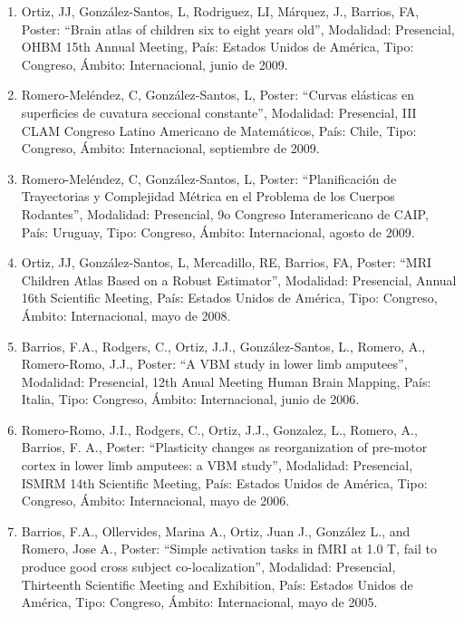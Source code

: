 \begin{enumerate}
\item Ortiz, JJ, González-Santos, L, Rodriguez, LI, Márquez, J., Barrios, FA, Poster: “Brain atlas of children 
six 
to eight years old”, Modalidad: Presencial, OHBM 15th Annual Meeting, País: Estados Unidos de América, Tipo: 
Congreso, Ámbito: Internacional, junio de 2009.

\item Romero-Meléndez, C, González-Santos, L, Poster: “Curvas elásticas en superficies de cuvatura seccional 
constante”, Modalidad: Presencial, III CLAM Congreso Latino Americano de Matemáticos, País: Chile, Tipo: 
Congreso, Ámbito: Internacional, septiembre de 2009.

\item Romero-Meléndez, C, González-Santos, L, Poster: “Planificación de Trayectorias y Complejidad Métrica en 
el 
Problema de los Cuerpos Rodantes”, Modalidad: Presencial, 9o Congreso Interamericano de CAIP, País: Uruguay, 
Tipo: Congreso, Ámbito: Internacional, agosto de 2009.

\item Ortiz, JJ, González-Santos, L, Mercadillo, RE, Barrios, FA, Poster: “MRI Children Atlas Based on a 
Robust 
Estimator”, Modalidad: Presencial, Annual 16th Scientific Meeting, País: Estados Unidos de América, Tipo: 
Congreso, Ámbito: Internacional, mayo de 2008.

\item Barrios, F.A., Rodgers, C., Ortiz, J.J., González-Santos, L., Romero, A., Romero-Romo, J.J., Poster: “A 
VBM 
study in lower limb amputees”, Modalidad: Presencial, 12th Anual Meeting Human Brain Mapping, País: Italia, 
Tipo: Congreso, Ámbito: Internacional, junio de 2006.

\item Romero-Romo, J.I., Rodgers, C., Ortiz, J.J., Gonzalez, L., Romero, A., Barrios, F. A., Poster: 
“Plasticity 
changes as reorganization of pre-motor cortex in lower limb amputees: a VBM study”, Modalidad: Presencial, 
ISMRM 14th Scientific Meeting, País: Estados Unidos de América, Tipo: Congreso, Ámbito: Internacional, mayo de 
2006.

\item Barrios, F.A., Ollervides, Marina A., Ortiz, Juan J., González L., and Romero, Jose A., Poster: “Simple 
activation tasks in fMRI at 1.0 T, fail to produce good cross subject co-localization”, Modalidad: Presencial, 
Thirteenth Scientific Meeting and Exhibition, País: Estados Unidos de América, Tipo: Congreso, Ámbito: 
Internacional, mayo de 2005.


\end{enumerate}
